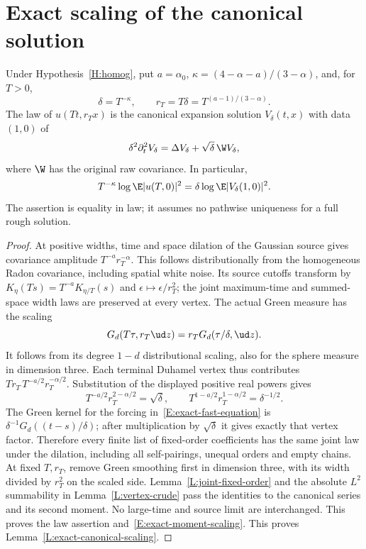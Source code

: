 \section{Exact scaling of the canonical solution}
\label{S:exact-canonical-scaling}

\begin{lemma}\label{L:exact-canonical-scaling}
  Under Hypothesis~\ref{H:homog}, put $a=\alpha_0$,
  $\kappa=(4-\alpha-a)/(3-\alpha)$, and, for $T>0$,
  \[
    \delta=T^{-\kappa},\qquad
    r_T=T\delta=T^{(a-1)/(3-\alpha)}.
  \]
  The law of $u(Tt,r_Tx)$ is the canonical expansion solution
  $V_\delta(t,x)$ with data $(1,0)$ of
  \begin{equation}\label{E:exact-fast-equation}
    \delta^2\partial_t^2V_\delta
    =\Delta V_\delta+\sqrt\delta\,\W V_\delta,
  \end{equation}
  where $\W$ has the original raw covariance. In particular,
  \begin{equation}\label{E:exact-moment-scaling}
    T^{-\kappa}\log\E|u(T,0)|^2
    =\delta\log\E|V_\delta(1,0)|^2.
  \end{equation}
  The assertion is equality in law; it assumes no pathwise uniqueness
  for a full rough solution.
\end{lemma}

\begin{proof}
  At positive widths, time and space dilation of the Gaussian source
  gives covariance amplitude $T^{-a}r_T^{-\alpha}$. This follows
  distributionally from the homogeneous Radon covariance, including
  spatial white noise. Its source cutoffs transform by
  $K_\eta(Ts)=T^{-a}K_{\eta/T}(s)$ and
  $\epsilon\mapsto\epsilon/r_T^2$; the joint maximum-time and
  summed-space width laws are preserved at every vertex.
  The actual Green measure has the scaling
  \[
    G_d(T\tau,r_T\ud z)
    =r_TG_d(\tau/\delta,\ud z).
  \]
  It follows from its degree $1-d$ distributional scaling, also for
  the sphere measure in dimension three. Each terminal Duhamel
  vertex thus contributes
  $Tr_T\,T^{-a/2}r_T^{-\alpha/2}$.
  Substitution of the displayed positive real powers gives
  \[
    T^{-a/2}r_T^{2-\alpha/2}=\sqrt\delta,\qquad
    T^{1-a/2}r_T^{1-\alpha/2}=\delta^{-1/2}.
  \]
  The Green kernel for the forcing in~\eqref{E:exact-fast-equation}
  is $\delta^{-1}G_d((t-s)/\delta)$; after multiplication by
  $\sqrt\delta$ it gives exactly that vertex factor.
  Therefore every finite list of fixed-order coefficients has the
  same joint law under the dilation, including all self-pairings,
  unequal orders and empty chains. At fixed $T,r_T$, remove Green
  smoothing first in dimension three, with its width divided by
  $r_T^2$ on the scaled side. Lemma~\ref{L:joint-fixed-order} and
  the absolute $L^2$ summability in Lemma~\ref{L:vertex-crude} pass
  the identities to the canonical series and its second moment.
  No large-time and source limit are interchanged. This proves the
  law assertion and~\eqref{E:exact-moment-scaling}.
  This proves Lemma~\ref{L:exact-canonical-scaling}.
\end{proof}
